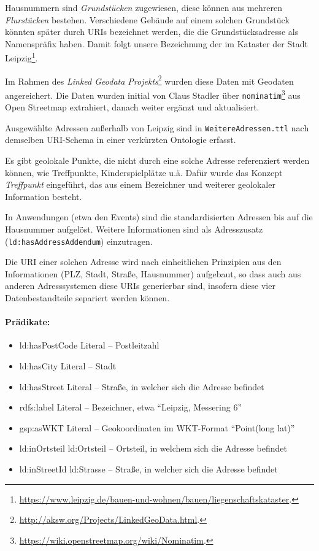 \documentclass[a4paper,11pt]{article}
\begin{document}
Hausnummern sind \emph{Grundstücken} zugewiesen, diese können aus mehreren
\emph{Flurstücken} bestehen. Verschiedene Gebäude auf einem solchen Grundstück
könnten später durch URIs bezeichnet werden, die die Grundstücksadresse als
Namenspräfix haben. Damit folgt unsere Bezeichnung der im Kataster der Stadt
Leipzig\footnote{\url{https://www.leipzig.de/bauen-und-wohnen/bauen/liegenschaftskataster}.}.

Im Rahmen des \emph{Linked Geodata
  Projekts}\footnote{\url{http://aksw.org/Projects/LinkedGeoData.html}.}
wurden diese Daten mit Geodaten angereichert. Die Daten wurden initial von
Claus Stadler über
\texttt{nominatim}\footnote{\url{https://wiki.openstreetmap.org/wiki/Nominatim}.}
aus Open Streetmap extrahiert, danach weiter ergänzt und aktualisiert.

Ausgewählte Adressen außerhalb von Leipzig sind in
\texttt{WeitereAdressen.ttl} nach demselben URI-Schema in einer verkürzten
Ontologie erfasst.

Es gibt geolokale Punkte, die nicht durch eine solche Adresse referenziert
werden können, wie Treffpunkte, Kinderspielplätze u.ä. Dafür wurde das Konzept
\emph{Treffpunkt} eingeführt, das aus einem Bezeichner und weiterer geolokaler
Information besteht.

In Anwendungen (etwa den Events) sind die standardisierten Adressen bis auf
die Hausnummer aufgelöst. Weitere Informationen sind als Adresszusatz
(\texttt{ld:hasAddressAddendum}) einzutragen.

Die URI einer solchen Adresse wird nach einheitlichen Prinzipien aus den
Informationen (PLZ, Stadt, Straße, Hausnummer) aufgebaut, so dass auch aus
anderen Adresssystemen diese URIs generierbar sind, insofern diese vier
Datenbestandteile separiert werden können.

\paragraph{Prädikate:}
\begin{itemize}
\item ld:hasPostCode Literal – Postleitzahl
\item ld:hasCity Literal – Stadt
\item ld:hasStreet Literal – Straße, in welcher sich die Adresse befindet
\item rdfs:label Literal – Bezeichner, etwa “Leipzig, Messering 6” 
\item gsp:asWKT Literal – Geokoordinaten im WKT-Format “Point(long lat)”
\item ld:inOrtsteil ld:Ortsteil – Ortsteil, in welchem sich die Adresse
  befindet
\item ld:inStreetId ld:Strasse – Straße, in welcher sich die Adresse befindet
\end{itemize}
\end{document}
